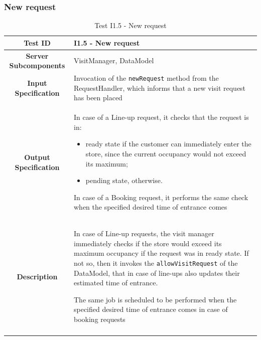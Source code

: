\documentclass[a4paper,oneside,11pt]{book}
\begin{document}
    \subsubsection{New request}
    \begin{longtable}[c]{|>{\bfseries{}}c|H{.5\textwidth}|}
        \hline
        Test ID & I1.5 - New request \\ \hline
        Server Subcomponents & VisitManager, DataModel \\ \hline
        Input Specification & Invocation of the \texttt{newRequest} method from the RequestHandler, which informs that a new visit request has been placed \\ \hline
        Output Specification & In case of a Line-up request, it checks that the request is in: 
        \begin{itemize}
            \item ready state if the customer can immediately enter the store, since the current occupancy would not exceed its maximum;
            \item pending state, otherwise.
        \end{itemize}
        In case of a Booking request, it performs the same check when the specified desired time of entrance comes \\ \hline
        Description & In case of Line-up requests, the visit manager immediately checks if the store would exceed its maximum occupancy if the request was in ready state. If not so, then it invokes the \texttt{allowVisitRequest} of the DataModel, that in case of line-ups also updates their estimated time of entrance. \par 
        The same job is scheduled to be performed when the specified desired time of entrance comes in case of booking requests \\ \hline
        \caption{Test I1.5 - New request}
        \label{table:test_I1.5}
    \end{longtable}
    
    
    \newpage
\end{document}
